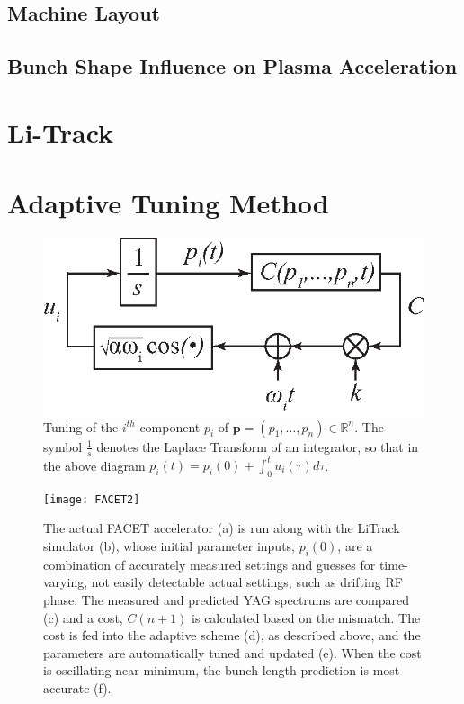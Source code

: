 \documentclass[%
twocolumn,
showpacs,preprintnumbers,
 aps,
prstab,
]{revtex4-1}
\begin{document}
\subsection{Machine Layout}




\subsection{Bunch Shape Influence on Plasma Acceleration}






\section{Li-Track}\label{sec:litrack}



\section{Adaptive Tuning Method}\label{sec:tune}

\begin{figure}[!t]
\centering
\includegraphics[width=.35\textwidth]{f2}
\caption{Tuning of the $i^{th}$ component  $p_i$ of $\mathbf{p} = (p_1, \dots, p_n) \in \mathbb{R}^n$. The symbol $\frac{1}{s}$ denotes the Laplace Transform of an integrator, so that in the above diagram $p_i(t) = p_i(0)+ \int_{0}^{t} u_i(\tau)d\tau$.}
\label{fig:th1}
\end{figure}

\begin{figure}[!t] 
    \centering
    \texttt{[image: FACET2]}
    \caption{The actual FACET accelerator (a) is run along with the LiTrack simulator (b), whose initial parameter inputs, $p_i(0)$, are a combination of accurately measured settings and guesses for time-varying, not easily detectable actual settings, such as drifting RF phase. The measured and predicted YAG spectrums are compared (c) and a cost, $C(n+1)$ is calculated based on the mismatch. The cost is fed into the adaptive scheme (d), as described above, and the parameters are automatically tuned and updated (e). When the cost is oscillating near minimum, the bunch length prediction is most accurate (f).}
    \label{fig:ltes}
\end{figure}
\end{document}
